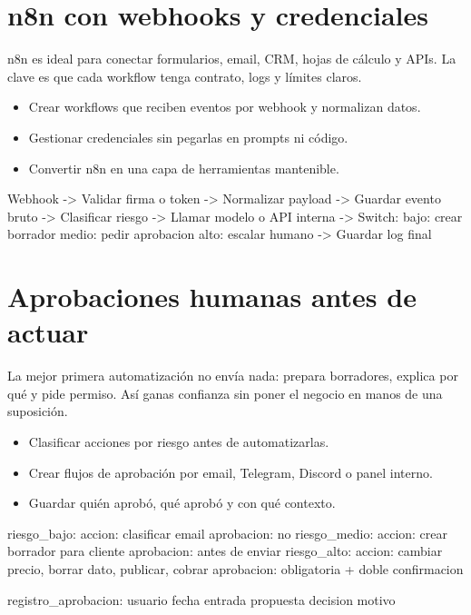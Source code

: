 \documentclass[11pt,a4paper]{book}
\begin{document}
\chapter{n8n con webhooks y credenciales}
n8n es ideal para conectar formularios, email, CRM, hojas de cálculo y APIs. La clave es que cada workflow tenga contrato, logs y límites claros.

\begin{itemize}\item Crear workflows que reciben eventos por webhook y normalizan datos.\end{itemize}
\begin{itemize}\item Gestionar credenciales sin pegarlas en prompts ni código.\end{itemize}
\begin{itemize}\item Convertir n8n en una capa de herramientas mantenible.\end{itemize}
\begin{codebox}
Webhook
  -> Validar firma o token
  -> Normalizar payload
  -> Guardar evento bruto
  -> Clasificar riesgo
  -> Llamar modelo o API interna
  -> Switch:
       bajo: crear borrador
       medio: pedir aprobacion
       alto: escalar humano
  -> Guardar log final
\end{codebox}
\chapter{Aprobaciones humanas antes de actuar}
La mejor primera automatización no envía nada: prepara borradores, explica por qué y pide permiso. Así ganas confianza sin poner el negocio en manos de una suposición.

\begin{itemize}\item Clasificar acciones por riesgo antes de automatizarlas.\end{itemize}
\begin{itemize}\item Crear flujos de aprobación por email, Telegram, Discord o panel interno.\end{itemize}
\begin{itemize}\item Guardar quién aprobó, qué aprobó y con qué contexto.\end{itemize}
\begin{codebox}
riesgo_bajo:
  accion: clasificar email
  aprobacion: no
riesgo_medio:
  accion: crear borrador para cliente
  aprobacion: antes de enviar
riesgo_alto:
  accion: cambiar precio, borrar dato, publicar, cobrar
  aprobacion: obligatoria + doble confirmacion

registro_aprobacion:
  usuario
  fecha
  entrada
  propuesta
  decision
  motivo
\end{codebox}
\end{document}
